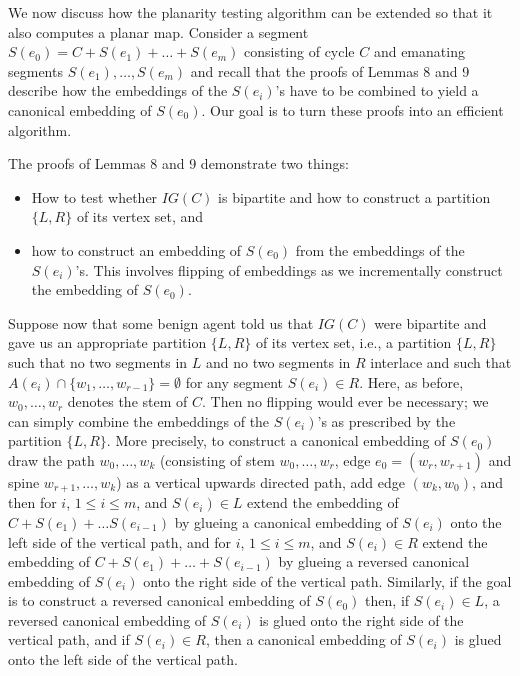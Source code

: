 


\newtheorem{theorem}{Theorem}

We now discuss how the planarity testing algorithm can be extended
so that it also computes a planar map.
Consider a segment $S(e_0)=C+S(e_1)+\ldots +S(e_m)$ consisting of
cycle $C$ and emanating segments $S(e_1),\ldots ,S(e_m)$ and
recall that the proofs of Lemmas 8 and 9 describe how
the embeddings of the $S(e_i)$'s have to be combined to yield a
canonical embedding of $S(e_0)$.
Our goal is to turn these proofs into an efficient algorithm.

The proofs of Lemmas 8 and 9 demonstrate two things:
\begin{itemize}
\item How to test whether $IG(C)$ is bipartite and how to construct
a partition $\{L,R\}$ of its vertex set, and
\item how to construct an embedding of $S(e_0)$ from the embeddings of
the $S(e_i)$'s. This involves flipping of embeddings as we
incrementally construct the embedding of $S(e_0)$.
\end{itemize}

Suppose now that some benign agent told us that $IG(C)$ were bipartite
and gave us an appropriate partition $\{L,R\}$ of its vertex set,
i.e., a partition $\{L,R\}$ such that no
two segments in $L$ and no two segments in $R$ interlace and such that
$A(e_i)\cap \{w_1,\ldots ,w_{r-1}\}=\emptyset$ for any segment
$S(e_i)\in R$.
Here, as before, $w_0,\ldots ,w_r$ denotes the stem of $C$.
Then no flipping would ever be necessary;
we can simply combine the embeddings of the $S(e_i)$'s as prescribed
by the partition $\{L,R\}$.
More precisely, to construct a canonical embedding of $S(e_0)$ draw
the path $w_0,\ldots ,w_k$ (consisting of stem $w_0,\ldots ,w_r$,
edge $e_0 = (w_r,w_{r+1})$ and spine $w_{r+1},\ldots ,w_k$) as a
vertical upwards directed path, add edge $(w_k,w_0)$, and then for $i$,
$1\leq i\leq m$, and $S(e_i)\in L$ extend the embedding of
$C+S(e_1)+\ldots S(e_{i-1})$ by glueing a canonical embedding of
$S(e_i)$ onto the left side of the vertical path, and for $i$,
$1\leq i\leq m$, and $S(e_i)\in R$ extend the embedding of
$C+S(e_1)+\ldots +S(e_{i-1})$ by glueing a reversed canonical
embedding of $S(e_i)$ onto the right side of the vertical path.
Similarly, if the goal is to construct a reversed canonical embedding
of $S(e_0)$ then, if $S(e_i)\in L$, a reversed canonical embedding of
$S(e_i)$ is glued onto the right side of the vertical path, and if
$S(e_i) \in R$, then a canonical embedding of $S(e_i)$ is glued onto the
left side of the vertical path.

